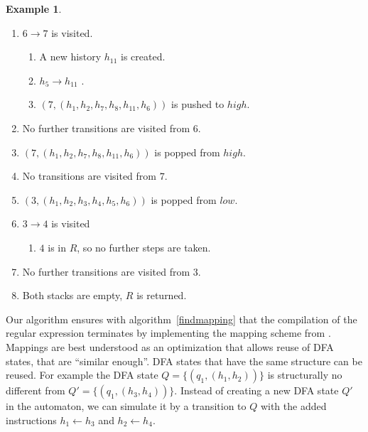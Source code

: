 \documentclass[english]{sigplanconf}
\theoremstyle{definition}
\newtheorem{example}{Example}[section]
\newcommand{\del}[1]{\textcolor{red}{\sout{#1}}} %
\newcommand{\del}[1]{} %
\renewcommand{\del}[1]{} %
\begin{document}
\begin{example}
\begin{enumerate}
\item $6\rightarrow 7$ is visited.\begin{enumerate}
	\item A new history $h_{11}$ is created.
	\item $h_5\rightarrow h_{11}$ \del{is executed}.
	\item $(7, (h_1, h_2, h_7, h_8, h_{11}, h_6))$ is pushed to $high$.
\end{enumerate}
\item No further transitions are visited from $6$.
\item $(7, (h_1, h_2, h_7, h_8, h_{11}, h_6))$ is popped from $high$.
\item No transitions are visited from $7$.
\item $(3, (h_1, h_2, h_3, h_4, h_5, h_6))$ is popped from $low$.
\item $3\rightarrow 4$ is visited \begin{enumerate}
	\item $4$ is in $R$, so no further steps are taken.
\end{enumerate}
\item No further transitions are visited from $3$.
\item Both stacks are empty, $R$ is returned.
\end{enumerate}
\label{ex:oneStep2}
\end{example}

Our algorithm ensures with algorithm~\ref{findmapping} that the 
compilation of the regular expression terminates by implementing 
the mapping scheme from \cite{Laur00a}. 
Mappings are best understood as an optimization that allows reuse
of DFA states, that are ``similar enough''. DFA states that have the 
same structure can be reused. For example the DFA state 
$Q=\{(q_1, (h_1, h_2))\}$ is structurally no different from 
$Q'=\{(q_1, (h_3, h_4))\}$. Instead of creating a new DFA state $Q'$ 
in the automaton, we can simulate it by a transition to $Q$ with the
added instructions $h_1\leftarrow h_3$ and $h_2 \leftarrow h_4$.
\end{document}
